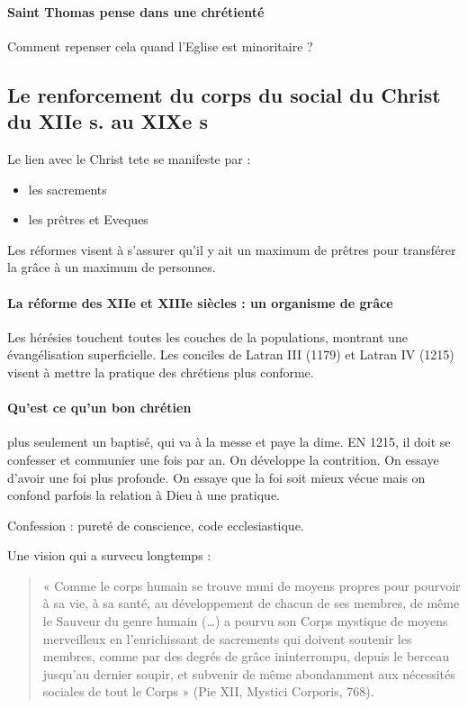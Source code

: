 \paragraph{Saint Thomas pense dans une chrétienté} Comment repenser cela quand l'Eglise est minoritaire ?


\subsection{Le renforcement du corps du social du Christ du XIIe s. au XIXe s}

Le lien avec le Christ tete se manifeste par : 
\begin{itemize}
    \item les sacrements
    \item les prêtres et Eveques
\end{itemize}

Les réformes visent à s'assurer qu'il y ait un maximum de prêtres pour transférer la grâce à un maximum de personnes.

\paragraph{La réforme des XIIe et XIIIe siècles : un organisme de grâce}
Les hérésies touchent toutes les couches de la populations, montrant une évangélisation superficielle. Les conciles de Latran III (1179) et Latran IV (1215) visent à mettre la pratique des chrétiens plus conforme.

\paragraph{Qu'est ce qu'un bon chrétien} plus seulement un baptisé, qui va à la messe et paye la dime. EN 1215, il doit se confesser et communier une fois par an. On développe la contrition. On essaye d'avoir une foi plus profonde. 
On essaye que la foi soit mieux vécue mais on confond parfois la relation à Dieu à une pratique.
\begin{Ex}
Confession : pureté de conscience, code ecclesiastique. 

\end{Ex}

Une vision qui a survecu longtemps : 
\begin{quote}
    « Comme le corps humain se trouve muni de moyens propres pour pourvoir à sa vie, à sa
santé, au développement de chacun de ses membres, de même le Sauveur du genre humain
(…) a pourvu son Corps mystique de moyens merveilleux en l’enrichissant de sacrements qui
doivent soutenir les membres, comme par des degrés de grâce ininterrompu, depuis le berceau
jusqu’au dernier soupir, et subvenir de même abondamment aux nécessités sociales de tout le
Corps » (Pie XII, Mystici Corporis, 768).
\end{quote}

